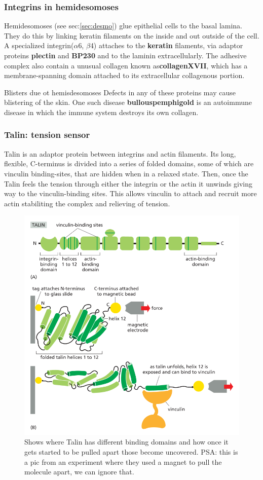 \documentclass[../main.tex]{subfiles}
\begin{document}
\subsubsection{Integrins in hemidesomoses}

Hemidesomoses (see sec:\ref{sec:desmo}) glue epithelial cells to the basal lamina. They do this by linking keratin filaments on the inside and out outside of the cell. A specialized integrin($\alpha$6, $\beta$4) attaches to the \textbf{keratin} filaments, via adaptor proteins \textbf{\gls{plectin}} and \textbf{\gls{BP230}} and to the laminin extracellularly. The adhesive complex also contain a unusual collagen known as\textbf{\gls{collagenXVII}}, which has a membrane-spanning domain attached to its extracellular collagenous portion.

\begin{RemarkWithTitel}{Blisters due ot hemisdesomoses}
	Defects in any of these proteins may cause blistering of the skin. One such disease \textbf{\gls{bullouspemphigold}} is an autoimmune disease in which the immune system destroys its own collagen.
\end{RemarkWithTitel}


\subsubsection{Talin: tension sensor}

\gls{Talin} is an adaptor protein between integrins and actin filaments. Its long, flexible, C-terminus is divided into a series of folded domains, some of which are vinculin binding-sites, that are hidden when in a relaxed state. Then, once the Talin feels the tension through either the integrin or the actin it unwinds giving way to the vinculin-binding sites. This allows vinculin to attach and recruit more actin stabiliting the complex and relieving of tension.

\begin{figure}[H]
	\centering
	\includegraphics[width=0.6\linewidth]{int_tal}
	\caption{Shows where Talin has different binding domains and how once it gets started to be pulled apart those become uncovered. PSA: this is a pic from an experiment where they used a magnet to pull the molecule apart, we can ignore that.}
	\label{fig:inttal}
\end{figure}
\end{document}
